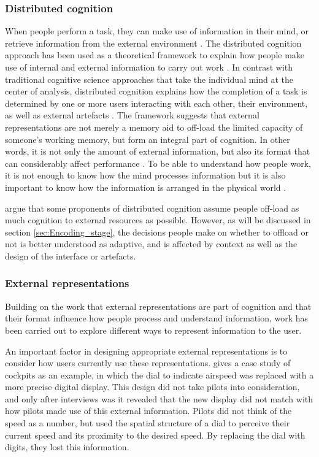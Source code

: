 \documentclass[11pt,oneside]{report}
\begin{document}
\subsubsection{Distributed cognition}
When people perform a task, they can make use of information in their mind, or retrieve information from the external environment \citep{Norman1993}.
The distributed cognition approach has been used as a theoretical framework to explain how people make use of internal and external information to carry out work \citep{Hollan2000}. In contrast with traditional cognitive science approaches that take the individual mind at the center of analysis, distributed cognition explains how the completion of a task is determined by one or more users interacting with each other, their environment, as well as external artefacts \citep{Hutchins1995}. The framework suggests that external representations are not merely a memory aid to off-load the limited capacity of someone's working memory, but form an integral part of cognition. In other words, it is not only the amount of external information, but also its format that can considerably affect performance \citep{Gong2009, Zhang2009}.
To be able to understand how people work, it is not enough to know how the mind processes information but it is also important to know how the information is arranged in the physical world \citep{Hollan2000}. 

\citet{Payne2013} argue that some proponents of distributed cognition assume people off-load as much cognition to external resources as possible. However, as will be discussed in section \ref{sec:Encoding_stage}, the decisions people make on whether to offload or not is better understood as adaptive, and is affected by context as well as the design of the interface or artefacts. 

\subsubsection{External representations}
Building on the work that external representations are part of cognition and that their format influence how people process and understand information, work has been carried out to explore different ways to represent information to the user. 

An important factor in designing appropriate external representations is to consider how users currently use these representations. \citet{Hutchins1995} gives a case study of cockpits as an example, in which the dial to indicate airspeed was replaced with a more precise digital display. This design did not take pilots into consideration, and only after interviews was it revealed that the new display did not match with how pilots made use of this external information. Pilots did not think of the speed as a number, but used the spatial structure of a dial to perceive their current speed and its proximity to the desired speed. By replacing the dial with digits, they lost this information. 
\end{document}
